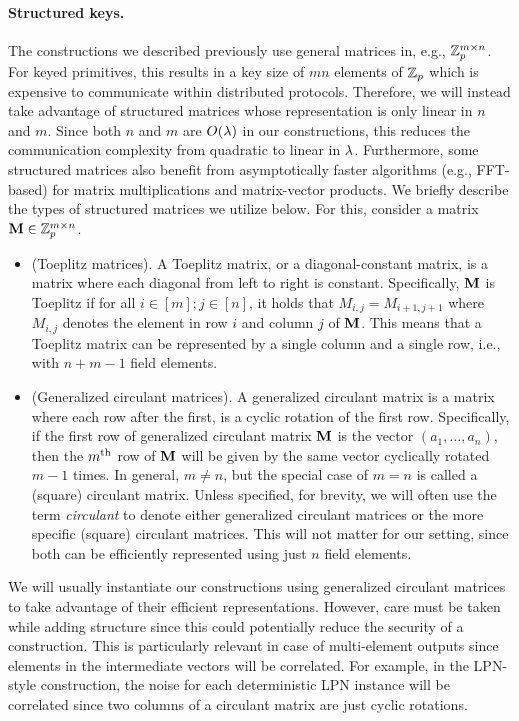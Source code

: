 \paragraph{Structured keys.}
The constructions we described previously use general matrices in, e.g., $\mathbb{Z}_p^{m \times n}$. For keyed primitives, this results in a key size of $mn$ elements of $\mathbb{Z}_p$ which is expensive to communicate within distributed protocols. Therefore, we will instead take advantage of structured matrices whose representation is only linear in $n$ and $m$. Since both $n$ and $m$ are $O(\lambda)$ in our constructions, this reduces the communication complexity from quadratic to linear in $\lambda$. Furthermore, some structured matrices also benefit from asymptotically faster algorithms (e.g., FFT-based) for matrix multiplications and matrix-vector products. We briefly describe the types of structured matrices we utilize below. For this, consider a matrix $\mat{M} \in \Z_p^{m \times n}$.

\begin{itemize}
    \item (Toeplitz matrices).
    A Toeplitz matrix, or a diagonal-constant matrix, is a matrix where each diagonal from left to right is constant. Specifically, $\mat{M}$ is Toeplitz if for all $i \in [m]; j \in [n]$, it holds that $M_{i,j} = M_{i+1, j+1}$ where $M_{i,j}$ denotes the element in row $i$ and column $j$ of $\mat{M}$. This means that a Toeplitz matrix can be represented by a single column and a single row, i.e., with $n + m - 1$ field elements.

    \item (Generalized circulant matrices). 
    A generalized circulant matrix is a matrix where each row after the first, is a cyclic rotation of the first row. Specifically, if the first row of generalized circulant matrix $\mat{M}$ is the vector $(a_1, \dots, a_n)$, then the $m^{\textnormal{th}}$ row of $\mat{M}$ will be given by the same vector cyclically rotated $m-1$ times. In general, $m \neq n$, but the special case of $m = n$ is called a (square) circulant matrix. Unless specified, for brevity, we will often use the term \textit{circulant} to denote either generalized circulant matrices or the more specific (square) circulant matrices. This will not matter for our setting, since both can be efficiently represented using just $n$ field elements.
\end{itemize}
\iffull
We will usually instantiate our constructions using generalized circulant matrices to take advantage of their efficient representations. However, care must be taken while adding structure since this could potentially reduce the security of a construction. This is particularly relevant in case of multi-element outputs since elements in the intermediate vectors will be correlated. For example, in the LPN-style construction, the noise for each deterministic LPN instance will be correlated since two columns of a circulant matrix are just cyclic rotations. 

